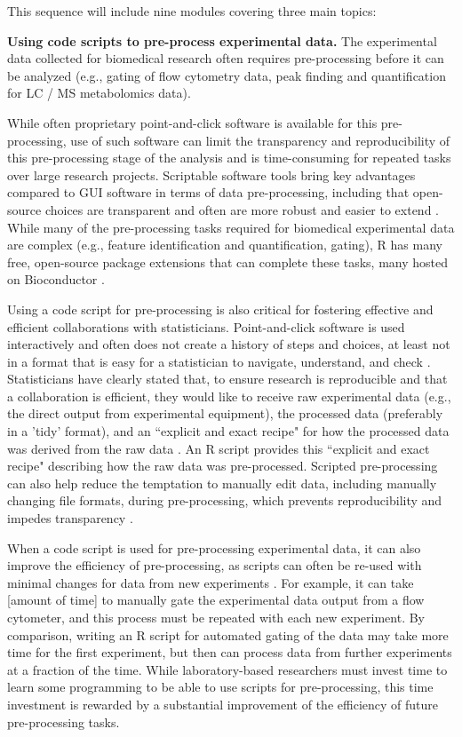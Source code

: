 \documentclass[pdftex,english,11pt,parskip=half]{scrartcl}
\begin{document}
This sequence will include nine modules
covering three main topics: 

\textbf{Using code scripts to pre-process experimental data.} The experimental data collected for biomedical research often requires 
pre-processing before it can be analyzed (e.g., gating of flow cytometry data, 
peak finding and quantification for LC / MS metabolomics data). 

While 
often proprietary point-and-click software is available for this pre-processing,
use of such software can limit the transparency and reproducibility of this 
pre-processing stage of the analysis and is 
time-consuming for repeated tasks over large research projects. Scriptable
software tools bring key advantages compared to GUI software in terms of data
pre-processing, including that open-source choices are transparent and often are more robust and easier to extend \cite{cetinkaya2017infrastructure, huber2015orchestrating,
preeyanon2014reproducible, piccolo2016tools, baumer2017lessons}. While many of the pre-processing tasks required for biomedical experimental data are complex (e.g., feature identification and quantification, gating), R has many free, open-source package extensions that can complete these tasks, many hosted on Bioconductor \cite{huber2015orchestrating}.

Using a code script for pre-processing is also critical for fostering effective and efficient collaborations with statisticians. Point-and-click software is used interactively and often does not create a history of steps and choices, at least not in a format that is easy for a statistician to navigate, understand, and check \cite{peng2011reproducible, pernet2015improving}. Statisticians have clearly stated that, to ensure research is reproducible and that a collaboration is efficient, they would like to receive raw experimental data (e.g., the direct output from experimental equipment), the processed data (preferably in a 'tidy' format), and an ``explicit and exact recipe" for how the processed data was derived from the raw data \cite{ellis2018share}. An R script provides this ``explicit and exact recipe" describing how the raw data was pre-processed. Scripted pre-processing can also help reduce the temptation to manually edit data, including manually changing file formats, during pre-processing, which prevents reproducibility and impedes transparency \cite{pernet2015improving}.

When a code script is used for pre-processing experimental data, it can also improve the efficiency of pre-processing, as scripts can often be re-used with minimal changes for data from new experiments \cite{pernet2015improving}. For example, it can take [amount of time] to manually gate the experimental data output from a flow cytometer, and this process must be repeated with each new experiment. By comparison, writing an R script for automated gating of the data may take more time for the first experiment, but then can process data from further experiments at a fraction of the time. While laboratory-based researchers must invest time to learn some programming to be able to use scripts for pre-processing, this time investment is rewarded by a substantial improvement of the efficiency of future pre-processing tasks. 
\end{document}
